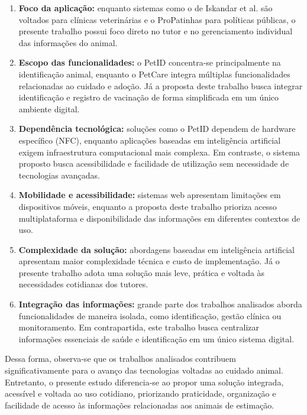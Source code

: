 \documentclass{UNESC}
\begin{document}
\begin{enumerate}[label=\alph*)]
    \item \textbf{Foco da aplicação:} enquanto sistemas como o de Iskandar et al. são voltados para clínicas veterinárias e o ProPatinhas para políticas públicas, o presente trabalho possui foco direto no tutor e no gerenciamento individual das informações do animal.

    \item \textbf{Escopo das funcionalidades:} o PetID concentra-se principalmente na identificação animal, enquanto o PetCare integra múltiplas funcionalidades relacionadas ao cuidado e adoção. Já a proposta deste trabalho busca integrar identificação e registro de vacinação de forma simplificada em um único ambiente digital.

    \item \textbf{Dependência tecnológica:} soluções como o PetID dependem de hardware específico (NFC), enquanto aplicações baseadas em inteligência artificial exigem infraestrutura computacional mais complexa. Em contraste, o sistema proposto busca acessibilidade e facilidade de utilização sem necessidade de tecnologias avançadas.

    \item \textbf{Mobilidade e acessibilidade:} sistemas web apresentam limitações em dispositivos móveis, enquanto a proposta deste trabalho prioriza acesso multiplataforma e disponibilidade das informações em diferentes contextos de uso.

    \item \textbf{Complexidade da solução:} abordagens baseadas em inteligência artificial apresentam maior complexidade técnica e custo de implementação. Já o presente trabalho adota uma solução mais leve, prática e voltada às necessidades cotidianas dos tutores.

    \item \textbf{Integração das informações:} grande parte dos trabalhos analisados aborda funcionalidades de maneira isolada, como identificação, gestão clínica ou monitoramento. Em contrapartida, este trabalho busca centralizar informações essenciais de saúde e identificação em um único sistema digital.
\end{enumerate}

Dessa forma, observa-se que os trabalhos analisados contribuem significativamente para o avanço das tecnologias voltadas ao cuidado animal. Entretanto, o presente estudo diferencia-se ao propor uma solução integrada, acessível e voltada ao uso cotidiano, priorizando praticidade, organização e facilidade de acesso às informações relacionadas aos animais de estimação.
\end{document}
